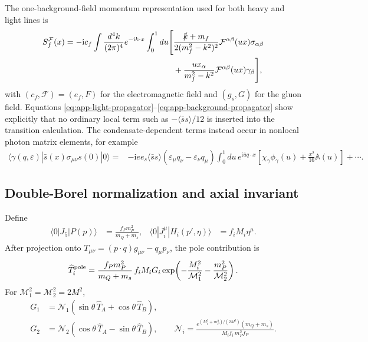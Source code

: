 \documentclass[11pt]{article}
\newcommand{\ii}{\mathrm{i}}
\newcommand{\ssbar}{\langle\bar s s\rangle}
\begin{document}
The one-background-field momentum representation used for both heavy and
light lines is
\begin{align}
 S_f^{\mathcal F}(x)=-\ii c_f\int\frac{d^4k}{(2\pi)^4}e^{-\ii k\cdot x}
 \int_0^1du\Bigg[
 &\frac{\slashed{k}+m_f}{2(m_f^2-k^2)^2}
 \mathcal F^{\alpha\beta}(ux)\sigma_{\alpha\beta}\nonumber\\
 &+\frac{ux_\alpha}{m_f^2-k^2}
 \mathcal F^{\alpha\beta}(ux)\gamma_\beta\Bigg],
 \label{eq:app-background-propagator}
\end{align}
with $(c_f,\mathcal F)=(e_f,F)$ for the electromagnetic field and
$(g_s,G)$ for the gluon field.  Equations
\eqref{eq:app-light-propagator}--\eqref{eq:app-background-propagator} show
explicitly that no ordinary local term such as
$-\langle\bar ss\rangle/12$ is inserted into the transition calculation.
The condensate-dependent terms instead occur in nonlocal photon matrix
elements, for example
\begin{align}
 \langle\gamma(q,\varepsilon)|\bar s(x)\sigma_{\mu\nu}s(0)|0\rangle
 ={}&-\ii e e_s\ssbar
 (\varepsilon_\mu q_\nu-\varepsilon_\nu q_\mu)
 \int_0^1du\,e^{\ii\bar u q\cdot x}
 \left[\chi_\gamma\phi_\gamma(u)
 +\frac{x^2}{16}\mathbb A(u)\right]+\cdots .
 \label{eq:app-photon-matrix-element}
\end{align}

\subsection{Double-Borel normalization and axial invariant}

Define
\begin{align}
 \langle0|J_5|P(p)\rangle&=\frac{f_Pm_P^2}{m_Q+m_s},&
 \langle0|J_i^\mu|H_i(p',\eta)\rangle&=f_iM_i\eta^\mu .
\end{align}
After projection onto
$T_{\mu\nu}=(p\!\cdot q)g_{\mu\nu}-q_\mu p_\nu$, the pole contribution is
\begin{equation}
 \widehat T_i^{\rm pole}
 =\frac{f_Pm_P^2}{m_Q+m_s}\,f_iM_iG_i
 \exp\!\left(-\frac{M_i^2}{\mathcal M_1^2}
             -\frac{m_P^2}{\mathcal M_2^2}\right).
 \label{eq:app-pole}
\end{equation}
For $\mathcal M_1^2=\mathcal M_2^2=2M^2$,
\begin{align}
 G_1&=\mathcal N_1(\sin\theta\,\widehat T_A
                   +\cos\theta\,\widehat T_B),\nonumber\\
 G_2&=\mathcal N_2(\cos\theta\,\widehat T_A
                   -\sin\theta\,\widehat T_B),\qquad
 \mathcal N_i=
 \frac{e^{(M_i^2+m_P^2)/(2M^2)}(m_Q+m_s)}
 {M_if_i\,m_P^2f_P}.
 \label{eq:app-physical-lcsr}
\end{align}
\end{document}
